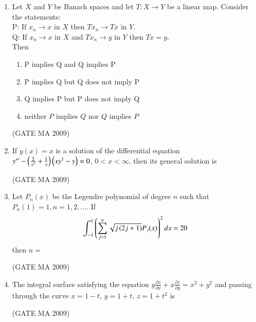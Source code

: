 \documentclass[journal,12pt,onecolumn]{IEEEtran}
\theoremstyle{remark}
\begin{document}
\begin{enumerate}[leftmargin=0pt, align=left, start=21]
\item Let $X$ and $Y$ be Banach spaces and let $T:X\to Y$ be a linear map. Consider the statements:\\
P: If $x_n\to x$ in $X$  then $Tx_n\to Tx$ in $Y$.\\
Q: If $x_n\to x$ in $X$ and $Tx_n\to y$ in $Y$ then $Tx=y$.\\
Then
\begin{enumerate}
    \item P implies Q and Q implies P
    \item P implies Q but Q does not imply P
    \item Q implies P but P does not imply Q
    \item neither $P$ implies $Q$ nor $Q$ implies $P$
\end{enumerate}
\hfill (GATE MA 2009)

\item If $y(x)=x$ is a solution of the differential equation $y'' - \left(\frac{2}{x^2}+\frac{1}{x}\right)\left(xy^1-y\right)=0$, $0<x<\infty$, then its general solution is
\begin{enumerate}
\end{enumerate}
\hfill (GATE MA 2009)

\item Let $P_n(x)$ be the Legendre polynomial of degree $n$ such that $P_n(1)=1, n=1,2,...$. If $$\int_{-1}^1\left(\sum_{j=1}^n\sqrt{j\left(2j+1\right)} P_j(x)\right)^2dx=20$$ then $n=$
\begin{enumerate}
\end{enumerate}
\hfill (GATE MA 2009)

\item The integral surface satisfying the equation $y\frac{\partial z}{\partial x}+x\frac{\partial z}{\partial y}=x^2+y^2$ and passing through the curve $x=1-t$, $y=1+t$, $z=1+t^2$ is
\begin{enumerate}
\end{enumerate}
\hfill (GATE MA 2009)


\end{enumerate}
\end{document}
